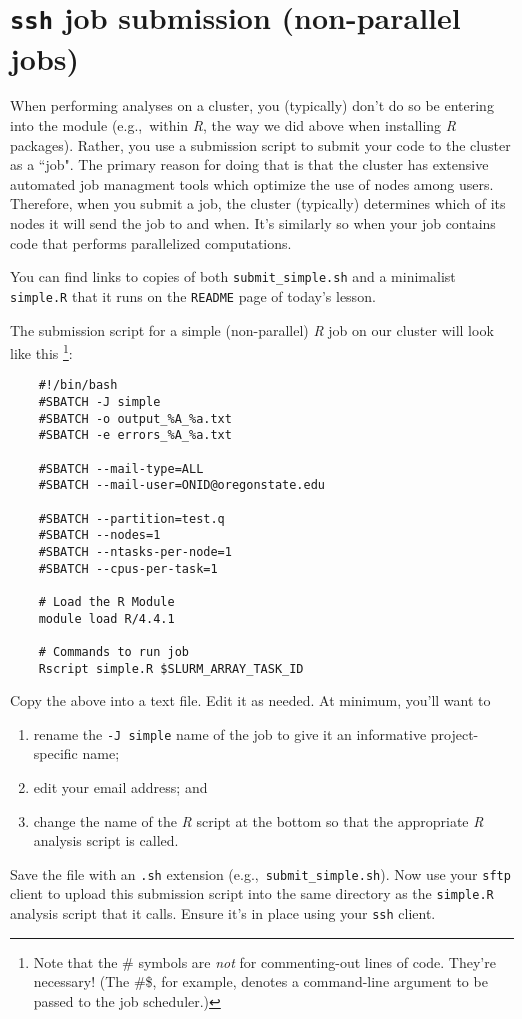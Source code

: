 \documentclass[12pt,letterpaper]{article}
\begin{document}
\section{\texttt{ssh} job submission (non-parallel jobs)}
When performing analyses on a cluster, you (typically) don't do so be entering into the module 
(e.g.,~within \emph{R}, the way we did above when installing \emph{R} packages).
Rather, you use a submission script to submit your code to the cluster as a ``job".
The primary reason for doing that is that the cluster has extensive automated job managment tools which optimize the use of nodes among users.
Therefore, when you submit a job, the cluster (typically) determines which of its nodes it will send the job to and when.
It's similarly so when your job contains code that performs parallelized computations.

\begin{tcolorbox}[breakable, enhanced, before upper={\parindent15pt}]
	\noindent
	You can find links to copies of both \texttt{submit\_simple.sh} and a minimalist \texttt{simple.R} that it runs on the \texttt{README} page of today's lesson.
\end{tcolorbox}

The submission script for a simple (non-parallel) \emph{R} job on our cluster will look like this
\unskip
\footnote{
	Note that the \# symbols are \emph{not} for commenting-out lines of code.  They're necessary!
	(The \#\$, for example, denotes a command-line argument to be passed to the job 
	scheduler.)}:
\begin{verbatim}
	#!/bin/bash
	#SBATCH -J simple
	#SBATCH -o output_%A_%a.txt
	#SBATCH -e errors_%A_%a.txt
	
	#SBATCH --mail-type=ALL
	#SBATCH --mail-user=ONID@oregonstate.edu
	
	#SBATCH --partition=test.q
	#SBATCH --nodes=1
	#SBATCH --ntasks-per-node=1
	#SBATCH --cpus-per-task=1
	
	# Load the R Module
	module load R/4.4.1
	
	# Commands to run job
	Rscript simple.R $SLURM_ARRAY_TASK_ID
\end{verbatim}

Copy the above into a text file.
Edit it as needed.  
At minimum, you'll want to
\begin{enumerate}
	\item rename the \texttt{-J simple} name of the job to give it an informative project-specific name;
	\item edit your email address; and	
	\item change the name of the \emph{R} script at the bottom so that the appropriate \emph{R} analysis script is called.
\end{enumerate}
Save the file with an \texttt{.sh} extension (e.g.,~\texttt{submit\_simple.sh}).
Now use your \texttt{sftp} client to upload this submission script into the same directory as the \texttt{simple.R} analysis script that it calls.
Ensure it's in place using your \texttt{ssh} client.
\end{document}
